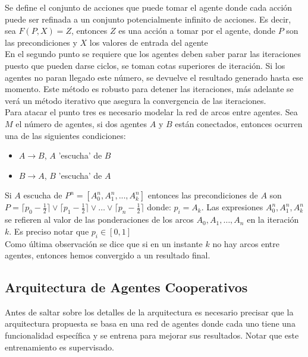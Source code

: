         Se define el conjunto de acciones que puede tomar el agente donde cada acción puede ser refinada a un conjunto potencialmente infinito de acciones. Es decir, sea $F(P,X)=Z$, entonces $Z$ es una acción a tomar por el agente, donde $P$ son las precondiciones y $X$ los valores de entrada del agente \\

        En el segundo punto se requiere que los agentes deben saber parar las iteraciones puesto que pueden darse ciclos, se toman cotas superiores de iteración. Si los agentes no paran llegado este número, se devuelve el resultado generado hasta ese momento. Este método es robusto para detener las iteraciones, más adelante se verá un método iterativo que asegura la convergencia de las iteraciones. \\

        Para atacar el punto tres es necesario modelar la red de arcos entre agentes. Sea $M$ el número de agentes, si dos agentes $A$ y $B$ están conectados, entonces ocurren una de las siguientes condiciones:

        \begin{itemize}
            \item $A\rightarrow B$, $A$ 'escucha' de $B$
            \item  $B \rightarrow A$, $B$ 'escucha' de $A$
        \end{itemize}

        Si $A$ escucha de $P^n=[A_0^n,A_1^n,...,A_k^n]$ entonces las precondiciones de $A$ son $P=\lceil p_0 - \frac{1}{2} \rceil \lor \lceil p_1 - \frac{1}{2} \rceil \lor \dots \lor \lceil p_n - \frac{1}{2} \rceil$ donde: 
        $p_i=A_k$. Las expresiones $A_0^n,A_1^n,A_k^n$ se refieren al valor de las ponderaciones de los arcos $A_0,A_1,\dots,A_n$ en la iteración $k$. Es preciso notar que $p_i \in [0,1]$ \\

        Como última observación se dice que si en un instante $k$ no hay arcos entre agentes, entonces hemos convergido a un resultado final.

    \subsection*{Arquitectura de Agentes Cooperativos}

        Antes de saltar sobre los detalles de la arquitectura es necesario precisar que la arquitectura propuesta se basa en una red de agentes donde cada uno tiene una funcionalidad específica y se entrena para mejorar sus resultados. Notar que este entrenamiento es supervisado. \\

